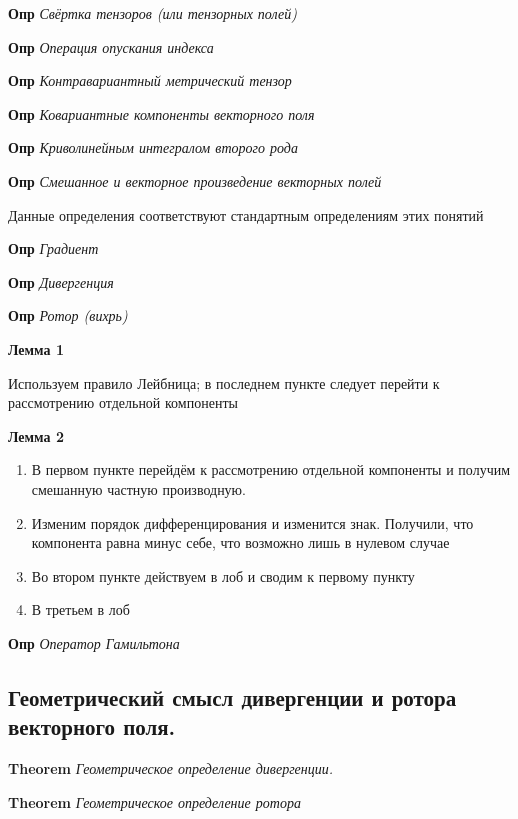\documentclass[a4paper, 14pt]{article}
\begin{document}
    \textbf{Опр} \textit{Свёртка тензоров (или тензорных полей)}
    
    \textbf{Опр} \textit{Операция опускания индекса}
    
    \textbf{Опр} \textit{Контравариантный метрический тензор}
    
    \textbf{Опр} \textit{Ковариантные компоненты векторного поля}
    
    \textbf{Опр} \textit{Криволинейным интегралом второго рода}
    
    \textbf{Опр} \textit{Смешанное и векторное произведение векторных полей}
    
    Данные определения соответствуют стандартным определениям этих понятий
    
    \textbf{Опр} \textit{Градиент}
    
    \textbf{Опр} \textit{Дивергенция}
    
    \textbf{Опр} \textit{Ротор (вихрь)}
    
    \textbf{Лемма 1}
    
    Используем правило Лейбница; в последнем пункте следует перейти к рассмотрению отдельной компоненты
    
    \textbf{Лемма 2}
    
    \begin{enumerate}
        \item В первом пункте перейдём к рассмотрению отдельной компоненты и получим смешанную частную производную.
        \item Изменим порядок дифференцирования и изменится знак.
        Получили, что компонента равна минус себе, что возможно лишь в нулевом случае
        \item Во втором пункте действуем в лоб и сводим к первому пункту
        \item В третьем в лоб
    \end{enumerate}
    
    \textbf{Опр} \textit{Оператор Гамильтона}
    
    \subsection{Геометрический смысл дивергенции и ротора векторного поля.}
    
    \textbf{Theorem} \textit{Геометрическое определение дивергенции.}
    
    \textbf{Theorem} \textit{Геометрическое определение ротора}
    
\end{document}
